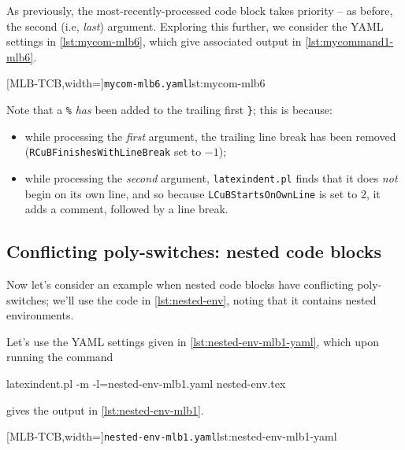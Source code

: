 	As previously, the most-recently-processed code block takes priority -- as before, the second (i.e, \emph{last}) argument.
	Exploring this further, we consider the YAML settings in \cref{lst:mycom-mlb6}, which give associated output in \cref{lst:mycommand1-mlb6}.

	\begin{minipage}{.4\linewidth}
	\end{minipage}
	\hfill
	\begin{minipage}{.55\linewidth}
		[MLB-TCB,width=\linewidth]{\texttt{mycom-mlb6.yaml}}{lst:mycom-mlb6}
	\end{minipage}

	Note that a \lstinline!%! \emph{has} been added to the trailing first \lstinline!}!; this is because: \begin{itemize} \item while processing the \emph{first} argument, the trailing line break has been removed (\texttt{RCuBFinishesWithLineBreak} set to $-1$);
		\item while processing the \emph{second} argument, \texttt{latexindent.pl} finds that it does \emph{not} begin on its own line, and so because \texttt{LCuBStartsOnOwnLine} is set to $2$, it adds a comment, followed by a line break.
	\end{itemize}

\subsection{Conflicting poly-switches: nested code blocks}
	Now let's consider an example when nested code blocks have conflicting poly-switches; we'll use the code in \cref{lst:nested-env}, noting that it contains nested environments.


	Let's use the YAML settings given in \cref{lst:nested-env-mlb1-yaml}, which upon running the command \begin{commandshell}
latexindent.pl -m -l=nested-env-mlb1.yaml nested-env.tex
        \end{commandshell} gives the output in \cref{lst:nested-env-mlb1}.

	\begin{minipage}{.45\linewidth}
	\end{minipage}
	\hfill
	\begin{minipage}{.55\linewidth}
		[MLB-TCB,width=\linewidth]{\texttt{nested-env-mlb1.yaml}}{lst:nested-env-mlb1-yaml}
	\end{minipage}

